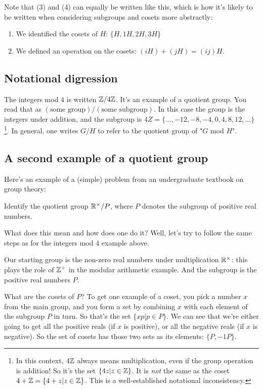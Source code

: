 Note that (3) and (4) can equally be written like this, which is how it's
likely to be written when considering subgroups and cosets more abstractly:

\begin{enumerate}
\item We identified the cosets of $H$: $\{H, 1H, 2H, 3H\}$
\item We defined an operation on the cosets: $(iH) + (jH) = (ij)H$.
\end{enumerate}

\subsection{Notational digression}

The integers mod $4$ is written $\mathbb{Z}/4\mathbb{Z}$. It's an example of a quotient
group. You read that as $(\text{some group}) / (\text{some subgroup})$. In this
case the group is the integers under addition, and the subgroup is
$4Z = \{\ldots, -12, -8, -4, 0, 4, 8, 12, \ldots\}$\footnote{In this context,
  $4\mathbb{Z}$ always means multiplication, even if the group operation is addition!
  So it's the set $\{4z|z \in \mathbb{Z}\}$. It is \emph{not} the same as the coset
  $4 + \mathbb{Z} = \{4+z|z \in \mathbb{Z}\}$. This is a well-established notational
  inconsistency.}. In general, one writes $G/H$ to refer to the quotient group
of "$G$ mod $H$".


\subsection{A second example of a quotient group}

Here's an example of a (simple) problem from an undergraduate textbook on group theory:\\

\begin{mdframed}
  Identify the quotient group $\mathbb{R}^\times/P$, where $P$ denotes the subgroup of
  positive real numbers.
\end{mdframed}

What does this mean and how does one do it? Well, let's try to follow the same
steps as for the integers mod $4$ example above.

Our starting group is the non-zero real numbers under multiplication $\mathbb{R}^\times$:
this plays the role of $\mathbb{Z}^+$ in the modular arithmetic example. And the
subgroup is the positive real numbers $P$.

What are the cosets of $P$? To get one example of a coset, you pick a number
$x$ from the main group, and you form a set by combining $x$ with each element
of the subgroup $P$ in turn. So that's the set $\{xp|p \in P\}$. We can see
that we're either going to get all the positive reals (if $x$ is positive), or
all the negative reals (if $x$ is negative). So the set of cosets has those two
sets as its elements: $\{P, -1P\}$.

